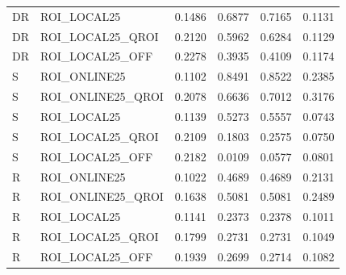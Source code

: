 \begin{longtable}{lp{.30\linewidth}rrrr}
DR & ROI\_LOCAL25 & 0.1486 & 0.6877 & 0.7165 & 0.1131 \\
DR & ROI\_LOCAL25\_QROI & 0.2120 & 0.5962 & 0.6284 & 0.1129 \\
DR & ROI\_LOCAL25\_OFF & 0.2278 & 0.3935 & 0.4109 & 0.1174 \\
S & ROI\_ONLINE25 & 0.1102 & 0.8491 & 0.8522 & 0.2385 \\
S & ROI\_ONLINE25\_QROI & 0.2078 & 0.6636 & 0.7012 & 0.3176 \\
S & ROI\_LOCAL25 & 0.1139 & 0.5273 & 0.5557 & 0.0743 \\
S & ROI\_LOCAL25\_QROI & 0.2109 & 0.1803 & 0.2575 & 0.0750 \\
S & ROI\_LOCAL25\_OFF & 0.2182 & 0.0109 & 0.0577 & 0.0801 \\
R & ROI\_ONLINE25 & 0.1022 & 0.4689 & 0.4689 & 0.2131 \\
R & ROI\_ONLINE25\_QROI & 0.1638 & 0.5081 & 0.5081 & 0.2489 \\
R & ROI\_LOCAL25 & 0.1141 & 0.2373 & 0.2378 & 0.1011 \\
R & ROI\_LOCAL25\_QROI & 0.1799 & 0.2731 & 0.2731 & 0.1049 \\
R & ROI\_LOCAL25\_OFF & 0.1939 & 0.2699 & 0.2714 & 0.1082 \\
\hline\end{longtable}
\endgroup


